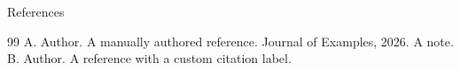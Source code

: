 \documentclass{beamer}
\begin{document}
\begin{frame}{References}
\begin{thebibliography}{99}
 A. Author.
  \newblock A manually authored reference.
  \newblock Journal of Examples, 2026.
  \newblock A note.
 B. Author.
  \newblock A reference with a custom citation label.
\end{thebibliography}
\end{frame}
\end{document}
